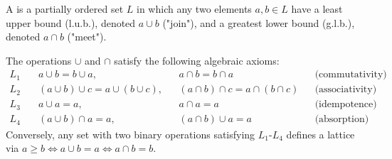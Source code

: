 A  is a partially ordered set $L$ in which any two elements $a, b \in L$ have a least upper bound (l.u.b.), denoted $a \cup b$ ("join"), and a greatest lower bound (g.l.b.), denoted $a \cap b$ ("meet").

The operations $\cup$ and $\cap$ satisfy the following algebraic axioms:
\begin{align*}
L_1 &\quad a \cup b = b \cup a, && a \cap b = b \cap a && \text{(commutativity)} \\
L_2 &\quad (a \cup b) \cup c = a \cup (b \cup c), && (a \cap b) \cap c = a \cap (b \cap c) && \text{(associativity)} \\
L_3 &\quad a \cup a = a, && a \cap a = a && \text{(idempotence)} \\
L_4 &\quad (a \cup b) \cap a = a, && (a \cap b) \cup a = a && \text{(absorption)}
\end{align*}
Conversely, any set with two binary operations satisfying $L_1$-$L_4$ defines a lattice via $a \geq b \iff a \cup b = a \iff a \cap b = b$.
